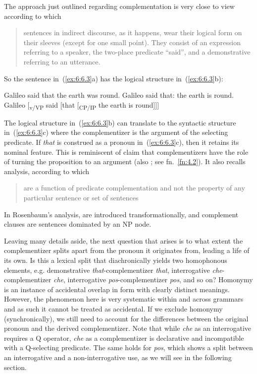 \documentclass[output=paper]{langsci/langscibook}
\begin{document}
The approach just outlined regarding complementation is very close to
 view according to which \blockquote{sentences
    in indirect discourse, as it happens, wear their logical form on their
    sleeves (except for one small point). They consist of an expression
referring to a speaker, the two-place predicate \enquote{said}, and a
demonstrative referring to an utterance.} So the sentence in~(\ref{ex:6:6.3}a) has the
logical structure in~(\ref{ex:6:6.3}b):

\ea\label{ex:6:6.3}
	\ea Galileo said that the earth was round.
	\ex Galileo said that: the earth is round.
	\ex Galileo [\textsubscript{v/VP} said [that [\textsubscript{CP/}\textsubscript{IP} the earth is round]]]
	\z
\z

The logical structure in~(\ref{ex:6:6.3}b) can translate to the syntactic structure in~(\ref{ex:6:6.3}c)
where the complementizer is the argument of the selecting predicate. If
\emph{that} is construed as a pronoun in~(\ref{ex:6:6.3}c), then it retains its nominal
feature. This is reminiscent of  claim that complementizers
have the role of turning the proposition to an argument (also
\citealt{Kayne2005b}; see fn.~\ref{fn:4.2}). It also recalls 
analysis, according to which  \blockquote{are a function of
    predicate complementation and not the property of any particular sentence
or set of sentences}.  In Rosenbaum’s analysis,  are introduced
transformationally, and complement clauses are sentences dominated by an NP
node.

Leaving many details aside, the next question that arises is to what extent the
complementizer splits apart from the pronoun it originates from, leading a life
of its own. Is this a lexical split that diachronically yields two homophonous
elements, e.g. demonstrative \emph{that}-com\-ple\-men\-tiz\-er \emph{that},
interrogative \emph{che}-com\-ple\-men\-tiz\-er \emph{che}, interrogative
\emph{pos}-complementizer \emph{pos}, and so on? Homonymy is an instance of
accidental overlap in form with clearly distinct meanings. However, the
phenomenon here is very systematic within and across grammars and as such it
cannot be treated as accidental. If we exclude homonymy (synchronically), we
still need to account for the differences between the original pronoun and the
derived complementizer. Note that while \emph{che} as an interrogative
requires a Q operator, \emph{che} as a complementizer is declarative and
incompatible with a Q-selecting predicate. The same holds for 
\emph{pos}, which shows a split between an interrogative and a
non-interrogative use, as we will see in the following section.
\end{document}
